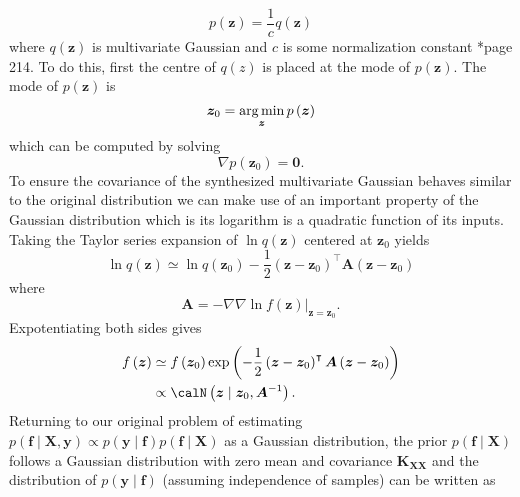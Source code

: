 \begin{equation*}
    p \left( \bm{z} \right) = \frac{1}{c} q \left( \bm{z} \right)
\end{equation*}
where $q \left( \bm{z} \right)$ is multivariate Gaussian and $c$ is some normalization constant \cite{BishopChristopherM2006Pram}*{page 214}. To do this, first the centre of $q \left( z \right)$ is placed at the mode of $p \left( \bm{z} \right)$. The mode of $p \left( \bm{z} \right)$ is
\begin{equation*}
    \bm{z}_0 = \operatorname*{\arg\min}_{\bm{z}} p \left( \bm{z} \right)
\end{equation*}
which can be computed by solving
\begin{equation} \label{eq: lapace-grad-zero}
    \nabla p \left( \bm{z}_0 \right) = \bm{0}.
\end{equation}
To ensure the covariance of the synthesized multivariate Gaussian behaves similar to the original distribution we can make use of an important property of the Gaussian distribution which is its logarithm is a quadratic function of its inputs. Taking the Taylor series expansion of $\ln q \left( \bm{z} \right)$ centered at $\bm{z}_0$ yields
\begin{equation*}
    \ln q \left( \bm{z} \right) \simeq \ln q \left( \bm{z}_0 \right) - \frac{1}{2} \left( \bm{z} - \bm{z}_0 \right)^{\intercal} \bm{A} \left( \bm{z} - \bm{z}_0 \right)
\end{equation*}
where
\begin{equation*}
    \bm{A} = - \nabla \nabla \left. \ln f \left( \bm{z} \right) \right|_{\bm{z} = \bm{z}_0}.
\end{equation*}
Expotentiating both sides gives
\begin{align}
    f \left( \bm{z} \right)
     & \simeq f \left( \bm{z}_0 \right) \exp \left( - \frac{1}{2} \left( \bm{z} - \bm{z}_0 \right)^{\intercal} \bm{A} \left( \bm{z} - \bm{z}_0 \right) \right) \nonumber \\
     & \propto \calN \left( \bm{z} \mid \bm{z}_0 , \bm{A}^{-1} \right) \label{eq: lapace-gauss-apprx} .
\end{align}
Returning to our original problem of estimating $p \left( \bm{f} \mid \bm{X} , \bm{y} \right) \propto p \left( \bm{y} \mid \bm{f} \right) p \left( \bm{f} \mid \bm{X} \right)$ as a Gaussian distribution, the prior $p \left( \bm{f} \mid \bm{X} \right)$ follows a Gaussian distribution with zero mean and covariance $\bm{K}_{\bm{X} \bm{X}}$ and the distribution of $p \left( \bm{y} \mid \bm{f} \right)$ (assuming independence of samples) can be written as
